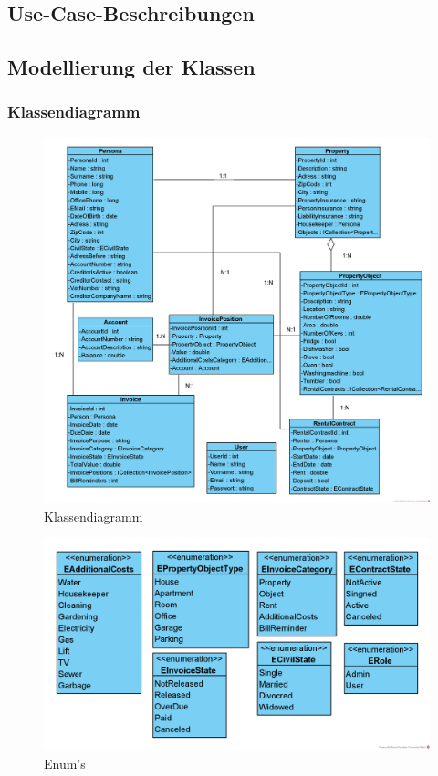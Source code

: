 \subsection{Use-Case-Beschreibungen}


\newpage
\subsection{Modellierung der Klassen}
\subsubsection{Klassendiagramm}
\vspace*{-0.5cm}
\begin{figure}[H]
  \begin{center}
    \includegraphics[width=0.9\linewidth]{content/diagrams/out/classdiagram/classdiagram.png}
    \caption{Klassendiagramm}
    \label{classdiagramm}
  \end{center}
\end{figure}

\vspace*{-1cm}

\begin{figure}[H]
  \begin{center}
    \includegraphics[width=0.65\linewidth]{content/diagrams/out/classdiagram/Enums.png}
    \caption{Enum's}
    \label{enums}
  \end{center}
\end{figure}

